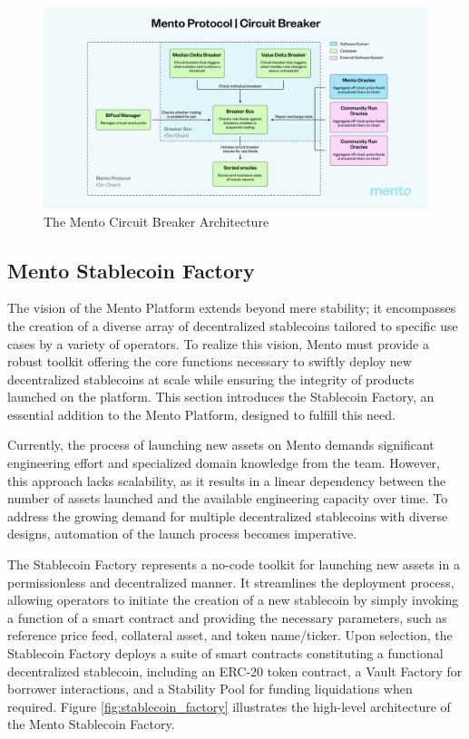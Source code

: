 \documentclass[a4paper]{article}
\theoremstyle{definition}
\begin{document}
\begin{figure}[ht]
    \centering
    \includegraphics[width=1.0\linewidth]{figures/mento_circuit_breaker.png}
    \caption{The Mento Circuit Breaker Architecture}
    \label{fig:circuit_breaker}
\end{figure}


\subsection{Mento Stablecoin Factory}

The vision of the Mento Platform extends beyond mere stability; it encompasses the creation of a diverse array of decentralized stablecoins tailored to specific use cases by a variety of operators. To realize this vision, Mento must provide a robust toolkit offering the core functions necessary to swiftly deploy new decentralized stablecoins at scale while ensuring the integrity of products launched on the platform. This section introduces the Stablecoin Factory, an essential addition to the Mento Platform, designed to fulfill this need.

Currently, the process of launching new assets on Mento demands significant engineering effort and specialized domain knowledge from the team. However, this approach lacks scalability, as it results in a linear dependency between the number of assets launched and the available engineering capacity over time. To address the growing demand for multiple decentralized stablecoins with diverse designs, automation of the launch process becomes imperative.

The Stablecoin Factory represents a no-code toolkit for launching new assets in a permissionless and decentralized manner. It streamlines the deployment process, allowing operators to initiate the creation of a new stablecoin by simply invoking a function of a smart contract and providing the necessary parameters, such as reference price feed, collateral asset, and token name/ticker. Upon selection, the Stablecoin Factory deploys a suite of smart contracts constituting a functional decentralized stablecoin, including an ERC-20 token contract, a Vault Factory for borrower interactions, and a Stability Pool for funding liquidations when required. Figure \ref{fig:stablecoin_factory} illustrates the high-level architecture of the Mento Stablecoin Factory. 
\end{document}
